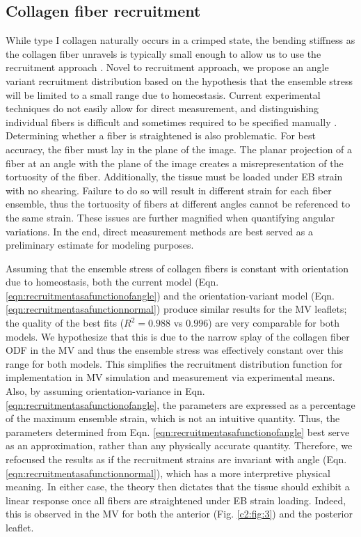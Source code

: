     
    
    
\subsection{Collagen fiber recruitment}

    While type I collagen naturally occurs in a crimped state, the bending stiffness as the collagen fiber unravels is typically small enough to allow us to use the recruitment approach \cite{lanir_constitutive_1983,fata_insights_2014,sacks_incorporation_2003,lanir_structural_1979,kastelic_structural_1980,hansen_recruitment_2002,cacho_constitutive_2007,grytz_constitutive_2009}. Novel to recruitment approach, we propose an angle variant recruitment distribution based on the hypothesis that the ensemble stress will be limited to a small range due to homeostasis. Current experimental techniques do not easily allow for direct measurement, and distinguishing individual fibers is difficult and sometimes required to be specified manually \cite{hill_theoretical_2012}. Determining whether a fiber is straightened is also problematic. For best accuracy, the fiber must lay in the plane of the image. The planar projection of a fiber at an angle with the plane of the image creates a misrepresentation of the tortuosity of the fiber. Additionally, the tissue must be loaded under EB strain with no shearing. Failure to do so will result in different strain for each fiber ensemble, thus the tortuosity of fibers at different angles cannot be referenced to the same strain. These issues are further magnified when quantifying angular variations. In the end, direct measurement methods are best served as a preliminary estimate for modeling purposes.


    Assuming that the ensemble stress of collagen fibers is constant with orientation due to homeostasis, both the current model (Eqn. \ref{eqn:recruitmentasafunctionofangle}) and the orientation-variant model (Eqn. \ref{eqn:recruitmentasafunctionnormal}) produce similar results for the MV leaflets; the quality of the best fits ($R^2 = 0.988$ vs $0.996$) are very comparable for both models. We hypothesize that this is due to the narrow splay of the collagen fiber ODF in the MV and thus the ensemble stress was effectively constant over this range for both models. This simplifies the recruitment distribution function for implementation in MV simulation and measurement via experimental means. Also, by assuming orientation-variance in Eqn. \ref{eqn:recruitmentasafunctionofangle}, the parameters are expressed as a percentage of the maximum ensemble strain, which is not an intuitive quantity. Thus, the parameters determined from Eqn. \ref{eqn:recruitmentasafunctionofangle} best serve as an approximation, rather than any physically accurate quantity. Therefore, we refocused the results as if the recruitment strains are invariant with angle (Eqn. \ref{eqn:recruitmentasafunctionnormal}), which has a more interpretive physical meaning. In either case, the theory then dictates that the tissue should exhibit a linear response once all fibers are straightened under EB strain loading. Indeed, this is observed in the MV for both the anterior (Fig. \ref{c2:fig:3}) and the posterior leaflet.


